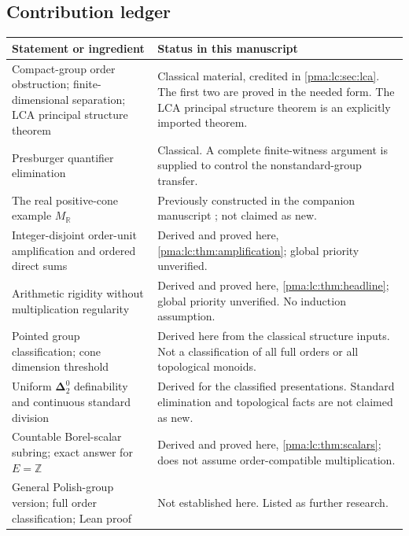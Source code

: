 \documentclass[11pt]{article}
\numberwithin{equation}{section}
\theoremstyle{definition}
\theoremstyle{remark}
\newcommand{\Z}{\mathbb Z}
\newcommand{\R}{\mathbb R}
\newcommand{\Dtwo}{\boldsymbol{\Delta}^{0}_{2}}
\begin{document}
\subsection{Contribution ledger}
\begin{longtable}{@{}>{\raggedright\arraybackslash}p{}>{\raggedright\arraybackslash}p{}@{}}
\toprule
Statement or ingredient & Status in this manuscript\\
\midrule
\endhead
Compact-group order obstruction; finite-dimensional separation; LCA
principal structure theorem & Classical material, credited in
\cref{pma:lc:sec:lca}. The first two are proved in the needed form. The LCA
principal structure theorem is an explicitly imported theorem.\\[4pt]
Presburger quantifier elimination & Classical. A complete finite-witness
argument is supplied to control the nonstandard-group transfer.\\[4pt]
The real positive-cone example $M_{\R}$ & Previously constructed in the
companion manuscript \cite{s08:PriorPres}; not claimed as new.\\[4pt]
Integer-disjoint order-unit amplification and ordered direct sums &
Derived and proved here, \cref{pma:lc:thm:amplification}; global priority
unverified.\\[4pt]
Arithmetic rigidity without multiplication regularity &
Derived and proved here, \cref{pma:lc:thm:headline}; global priority
unverified. No induction assumption.\\[4pt]
Pointed group classification; cone dimension threshold &
Derived here from the classical structure inputs. Not a classification
of all full orders or all topological monoids.\\[4pt]
Uniform $\Dtwo$ definability and continuous standard division &
Derived for the classified presentations. Standard elimination and
topological facts are not claimed as new.\\[4pt]
Countable Borel-scalar subring; exact answer for $E=\Z$ &
Derived and proved here, \cref{pma:lc:thm:scalars}; does not assume
order-compatible multiplication.\\[4pt]
General Polish-group version; full order classification; Lean proof &
Not established here. Listed as further research.\\
\bottomrule
\end{longtable}
\end{document}
